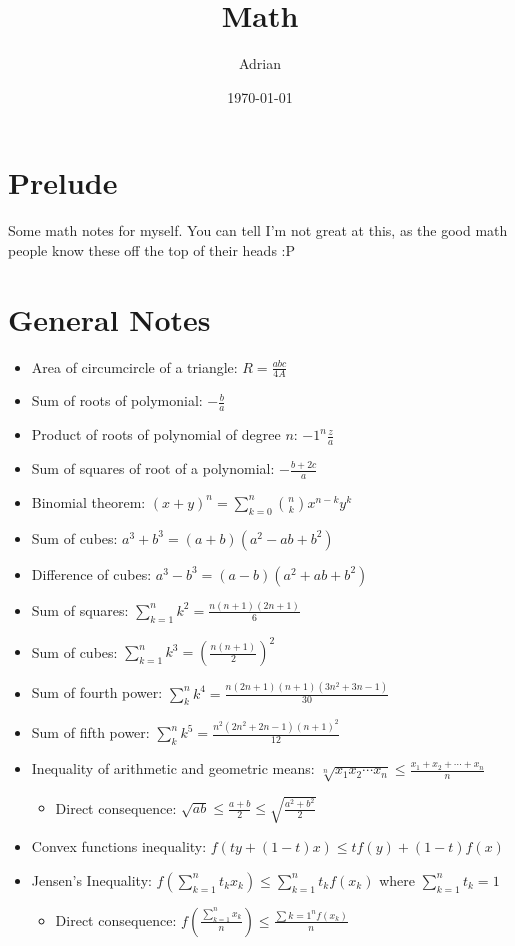 \documentclass{article}
\begin{document}
\title{Math}
\date{\today}
\author{Adrian}
\maketitle

\section{Prelude}
Some math notes for myself. You can tell I'm not great at this, as the good math people know these off the top of their heads :P

\section{General Notes}
\begin{itemize}
	\item Area of circumcircle of a triangle: $R = \frac{abc}{4A}$
	\item Sum of roots of polymonial: $-\frac{b}{a}$
	\item Product of roots of polynomial of degree $n$: ${-1}^{n}\frac{z}{a}$
	\item Sum of squares of root of a polynomial: $-\frac{b + 2c}{a}$
	\item Binomial theorem: $(x + y)^n = \sum_{k=0}^{n} {n \choose k}x^{n - k}y^k$
	\item Sum of cubes: $a^3 + b^3 = (a + b)(a^2 - ab + b^2)$
	\item Difference of cubes: $a^3 - b^3 = (a - b)(a^2 + ab + b^2)$
	\item Sum of squares: $\sum_{k=1}^{n} k^2 = \frac{n(n + 1)(2n + 1)}{6}$
	\item Sum of cubes: $\sum_{k=1}^{n} k^3 = (\frac{n(n + 1)}{2})^2$
	\item Sum of fourth power: $\sum_{k}^{n} k^4 = \frac{n(2n + 1)(n + 1)(3n^2 + 3n - 1)}{30}$
	\item Sum of fifth power: $\sum_{k}^{n} k^5 = \frac{n^{2}(2n^2 + 2n - 1)(n + 1)^2}{12}$
	\item Inequality of arithmetic and geometric means: $\sqrt[n]{x_{1}x_{2}\cdots{}x_{n}} \leq \frac{x_1 + x_2 + \cdots + x_n}{n}$
	\begin{itemize}
		\item Direct consequence: $\sqrt{ab} \leq \frac{a + b}{2} \leq \sqrt{\frac{a^2 + b^2}{2}}$
	\end{itemize}
	\item Convex functions inequality: $f(ty + (1 - t)x) \leq tf(y) + (1 - t)f(x)$
	\item Jensen's Inequality: $f(\sum_{k=1}^{n} t_{k}x_{k}) \leq \sum_{k=1}^{n} t_{k}f(x_{k})$ where $\sum_{k=1}^{n} t_k = 1$
	\begin{itemize}
		\item Direct consequence: $f(\frac{\sum_{k=1}^{n} x_k}{n}) \leq \frac{\sum{k=1}^{n} f(x_{k})}{n}$
	\end{itemize}
\end{itemize}
\end{document}
